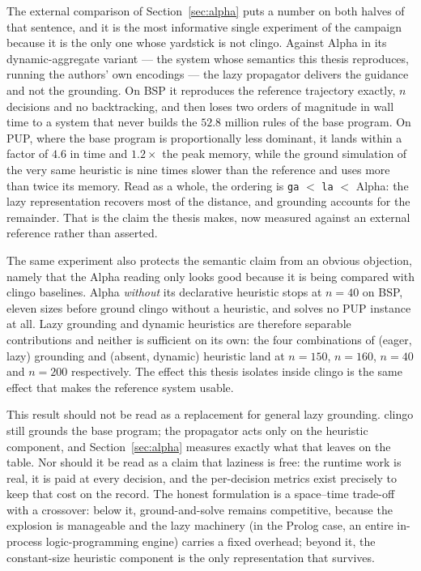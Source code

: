 The external comparison of Section~\ref{sec:alpha} puts a number on both halves of that sentence, and it is the most informative single experiment of the campaign because it is the only one whose yardstick is not clingo. Against Alpha in its dynamic-aggregate variant --- the system whose semantics this thesis reproduces, running the authors' own encodings --- the lazy propagator delivers the guidance and not the grounding. On BSP it reproduces the reference trajectory exactly, $n$ decisions and no backtracking, and then loses two orders of magnitude in wall time to a system that never builds the $52.8$ million rules of the base program. On PUP, where the base program is proportionally less dominant, it lands within a factor of $4.6$ in time and $1.2\times$ the peak memory, while the ground simulation of the very same heuristic is nine times slower than the reference and uses more than twice its memory. Read as a whole, the ordering is \texttt{ga} $<$ \texttt{la} $<$ Alpha: the lazy representation recovers most of the distance, and grounding accounts for the remainder. That is the claim the thesis makes, now measured against an external reference rather than asserted.

The same experiment also protects the semantic claim from an obvious objection, namely that the Alpha reading only looks good because it is being compared with clingo baselines. Alpha \emph{without} its declarative heuristic stops at $n=40$ on BSP, eleven sizes before ground clingo without a heuristic, and solves no PUP instance at all. Lazy grounding and dynamic heuristics are therefore separable contributions and neither is sufficient on its own: the four combinations of (eager, lazy) grounding and (absent, dynamic) heuristic land at $n=150$, $n=160$, $n=40$ and $n=200$ respectively. The effect this thesis isolates inside clingo is the same effect that makes the reference system usable.

This result should not be read as a replacement for general lazy grounding. clingo still grounds the base program; the propagator acts only on the heuristic component, and Section~\ref{sec:alpha} measures exactly what that leaves on the table. Nor should it be read as a claim that laziness is free: the runtime work is real, it is paid at every decision, and the per-decision metrics exist precisely to keep that cost on the record. The honest formulation is a space--time trade-off with a crossover: below it, ground-and-solve remains competitive, because the explosion is manageable and the lazy machinery (in the Prolog case, an entire in-process logic-programming engine) carries a fixed overhead; beyond it, the constant-size heuristic component is the only representation that survives.

